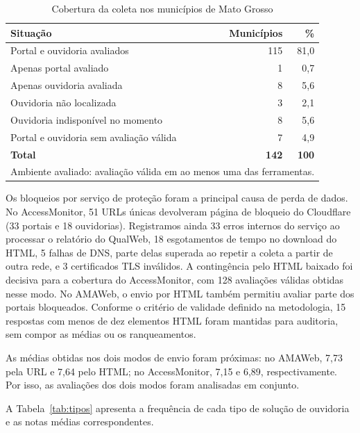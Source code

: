 \documentclass[12pt]{article}
\begin{document}
\begin{table}[ht]
\centering
\caption{Cobertura da coleta nos municípios de Mato Grosso}
\label{tab:amostra}
\begin{tabular}{lrr}
\toprule
\textbf{Situação} & \textbf{Municípios} & \textbf{\%} \\
\midrule
Portal e ouvidoria avaliados            & 115 & 81,0 \\
Apenas portal avaliado                  &   1 &  0,7 \\
Apenas ouvidoria avaliada               &   8 &  5,6 \\
Ouvidoria não localizada                &   3 &  2,1 \\
Ouvidoria indisponível no momento       &   8 &  5,6 \\
Portal e ouvidoria sem avaliação válida &   7 &  4,9 \\
\midrule
\textbf{Total}                          & \textbf{142} & \textbf{100} \\
\bottomrule
\multicolumn{3}{l}{\footnotesize Ambiente avaliado: avaliação válida em ao menos uma das ferramentas.}
\end{tabular}
\end{table}

Os bloqueios por serviço de proteção foram a principal causa de perda de dados. No AccessMonitor, 51 URLs únicas devolveram página de bloqueio do Cloudflare (33 portais e 18 ouvidorias). Registramos ainda 33 erros internos do serviço ao processar o relatório do QualWeb, 18 esgotamentos de tempo no download do HTML, 5 falhas de DNS, parte delas superada ao repetir a coleta a partir de outra rede, e 3 certificados TLS inválidos. A contingência pelo HTML baixado foi decisiva para a cobertura do AccessMonitor, com 128 avaliações válidas obtidas nesse modo. No AMAWeb, o envio por HTML também permitiu avaliar parte dos portais bloqueados. Conforme o critério de validade definido na metodologia, 15 respostas com menos de dez elementos HTML foram mantidas para auditoria, sem compor as médias ou os ranqueamentos.

As médias obtidas nos dois modos de envio foram próximas: no AMAWeb, 7,73 pela URL e 7,64 pelo HTML; no AccessMonitor, 7,15 e 6,89, respectivamente. Por isso, as avaliações dos dois modos foram analisadas em conjunto.

A Tabela~\ref{tab:tipos} apresenta a frequência de cada tipo de solução de ouvidoria e as notas médias correspondentes.
\end{document}
